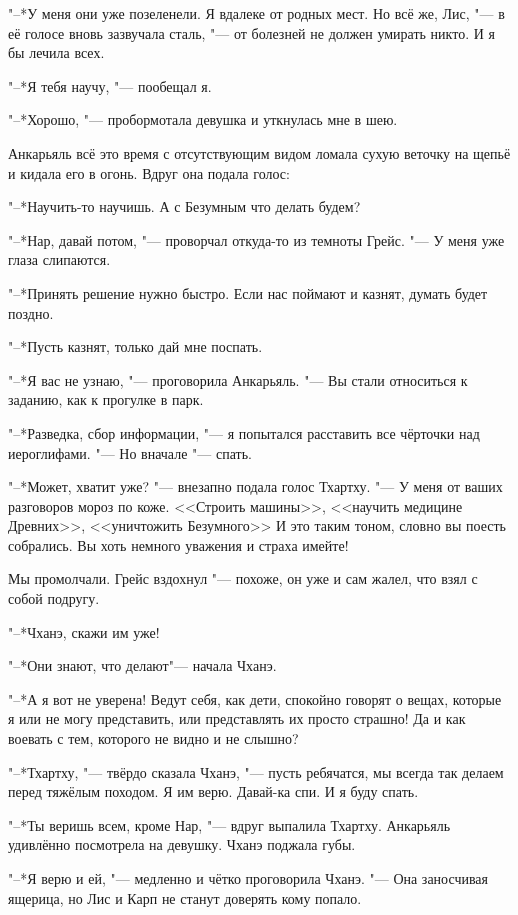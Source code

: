 "--*У меня они уже позеленели.
Я вдалеке от родных мест.
Но всё же, Лис, "--- в её голосе вновь зазвучала сталь, "--- от болезней не должен умирать никто.
И я бы лечила всех.

"--*Я тебя научу, "--- пообещал я.

"--*Хорошо, "--- пробормотала девушка и уткнулась мне в шею.

Анкарьяль всё это время с отсутствующим видом ломала сухую веточку на щепьё и кидала его в огонь.
Вдруг она подала голос:

"--*Научить-то научишь.
А с Безумным что делать будем?

"--*Нар, давай потом, "--- проворчал откуда-то из темноты Грейс.
"--- У меня уже глаза слипаются.

"--*Принять решение нужно быстро.
Если нас поймают и казнят, думать будет поздно.

"--*Пусть казнят, только дай мне поспать.

"--*Я вас не узнаю, "--- проговорила Анкарьяль.
"--- Вы стали относиться к заданию, как к прогулке в парк.

"--*Разведка, сбор информации, "--- я попытался расставить все чёрточки над иероглифами.
"--- Но вначале "--- спать.

"--*Может, хватит уже? "--- внезапно подала голос Тхартху.
"--- У меня от ваших разговоров мороз по коже.
<<Строить машины>>, <<научить медицине Древних>>, <<уничтожить Безумного>>\ldotst
И это таким тоном, словно вы поесть собрались.
Вы хоть немного уважения и страха имейте!

Мы промолчали.
Грейс вздохнул "--- похоже, он уже и сам жалел, что взял с собой подругу.

"--*Чханэ, скажи им уже!

"--*Они знают, что делают\ldotst "--- начала Чханэ.

"--*А я вот не уверена!
Ведут себя, как дети, спокойно говорят о вещах, которые я или не могу представить, или представлять их просто страшно!
Да и как воевать с тем, которого не видно и не слышно?

"--*Тхартху, "--- твёрдо сказала Чханэ, "--- пусть ребячатся, мы всегда так делаем перед тяжёлым походом.
Я им верю.
Давай-ка спи.
И я буду спать.

"--*Ты веришь всем, кроме Нар, "--- вдруг выпалила Тхартху.
Анкарьяль удивлённо посмотрела на девушку.
Чханэ поджала губы.

"--*Я верю и ей, "--- медленно и чётко проговорила Чханэ.
"--- Она заносчивая ящерица, но Лис и Карп не станут доверять кому попало.

